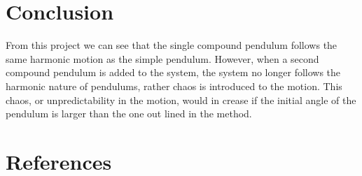 \documentclass[12pt, a4paper]{article}
\begin{document}
\section{Conclusion}
From this project we can see that the single compound pendulum follows the same harmonic motion as the simple pendulum. However, when a second compound pendulum is added to the system, the system no longer follows the harmonic nature of pendulums, rather chaos is introduced to the motion. This chaos, or unpredictability in the motion, would in crease if the initial angle of the pendulum is larger than the one out lined in the method.

\section{References}
\printbibliography[heading = none]
\end{document}
